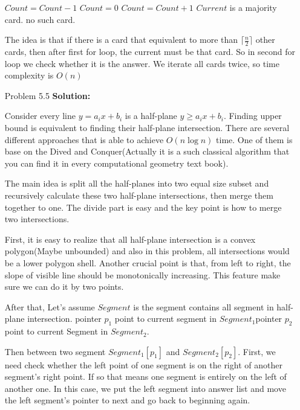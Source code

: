 \normalfont\documentclass[letterpaper,11pt]{article}
\begin{document}
\begin{enumerate}
\begin{algorithmic}
					\Else
						\State $Count = Count - 1$
					\EndIf
				\EndIf
			\EndFor
			\State $Count = 0$
					\State $Count = Count + 1$	
				\EndIf			
			\EndFor
				\State \Return $Current$ is a majority card.
			\Else
				\State \Return no such card.
			\EndIf
		\EndFunction
	\end{algorithmic}
	The idea is that if there is a card that equivalent to more than $\lceil \frac{n}{2} \rceil$ other cards, then after first for loop, the current must be that card. So in second for loop we check whether it is the answer. We iterate all cards twice, so time complexity is $O(n)$
\item [Problem 5.5]\textbf{Solution:}\par
	Consider every line $y = a_i x + b_i$ is a half-plane $y \ge a_i x + b_i$. Finding upper bound is equivalent to finding their half-plane intersection. There are several different approaches that is able to achieve $O(n\log n)$ time. One of them is base on the Dived and Conquer(Actually it is a such classical algorithm that you can find it in every computational geometry text book).\par
	The main idea is split all the half-planes into two equal size subset and recursively calculate these two half-plane intersections, then merge them together to one. The divide part is easy and the key point is how to merge two intersections. \par
	First, it is easy to realize that all half-plane intersection is a convex polygon(Maybe unbounded) and also in this problem, all intersections would be a lower polygon shell. Another crucial point is that, from left to right, the slope of visible line should be monotonically increasing. This feature make sure we can do it by two points.\par
	After that, Let's assume $Segment$ is the segment contains all segment in half-plane intersection. pointer $p_1$ point to current segment in $Segment_1$pointer $p_2$ point to current Segment in $Segment_2$. \par
	Then between two segment $Segment_1[p_1]$ and $Segment_2[p_2]$. First, we need check whether the left point of one segment is on the right of another segment's right point. If so that means one segment is entirely on the left of another one. In this case, we put the left segment into answer list and move the left segment's pointer to next and go back to beginning again.\par

\end{enumerate}
\end{document}
